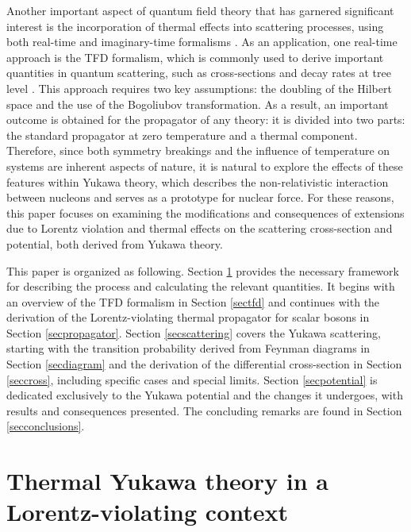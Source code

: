 \documentclass[11pt,showpacs,preprintnumbers,amsmath,amssymb,prd,nofootinbib,superscriptaddress]{revtex4-2}
\begin{document}
Another important aspect of quantum field theory that has garnered significant interest is the incorporation of thermal effects into scattering processes, using both real-time and imaginary-time formalisms \cite{temp00, temp000, khannatfd, temp1, temp2, temp3, temp4}. As an application, one real-time approach is the TFD formalism, which is commonly used to derive important quantities in quantum scattering, such as cross-sections and decay rates at tree level \cite{scatter2, santos2022temperature, santos2016quantized,santos2019thermal}. This approach requires two key assumptions: the doubling of the Hilbert space and the use of the Bogoliubov transformation. As a result, an important outcome is obtained for the propagator of any theory: it is divided into two parts: the standard propagator at zero temperature and a thermal component. Therefore, since both symmetry breakings and the influence of temperature on systems are inherent aspects of nature, it is natural to explore the effects of these features within Yukawa theory, which describes the non-relativistic interaction between nucleons and serves as a prototype for nuclear force. For these reasons, this paper focuses on examining the modifications and consequences of extensions due to Lorentz violation and thermal effects on the scattering cross-section and potential, both derived from Yukawa theory. 

This paper is organized as following. Section \ref{sec1} provides the necessary framework for describing the process and calculating the relevant quantities. It begins with an overview of the TFD formalism in Section \ref{sectfd} and continues with the derivation of the Lorentz-violating thermal propagator for scalar bosons in Section \ref{secpropagator}. Section \ref{secscattering} covers the Yukawa scattering, starting with the transition probability derived from Feynman diagrams in Section \ref{secdiagram} and the derivation {of the differential cross-section in Section \ref{seccross}}, including specific cases and special limits. Section \ref{secpotential} is dedicated exclusively to the Yukawa potential and the changes it undergoes, with results and consequences presented. The concluding remarks are found in Section \ref{secconclusions}.


\section{Thermal Yukawa theory in a Lorentz-violating context}\label{sec1}
\end{document}
